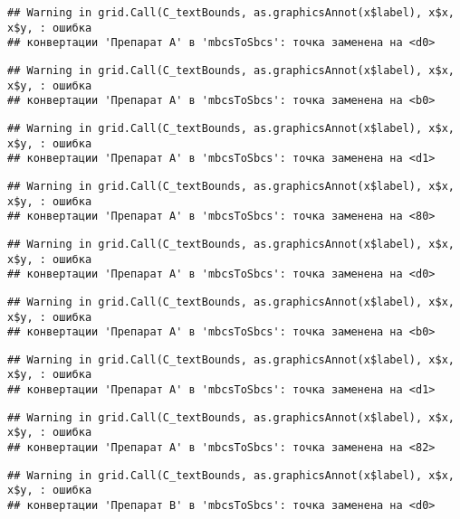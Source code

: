 \documentclass[
]{article}
\begin{document}
\begin{verbatim}
## Warning in grid.Call(C_textBounds, as.graphicsAnnot(x$label), x$x, x$y, : ошибка
## конвертации 'Препарат A' в 'mbcsToSbcs': точка заменена на <d0>
\end{verbatim}

\begin{verbatim}
## Warning in grid.Call(C_textBounds, as.graphicsAnnot(x$label), x$x, x$y, : ошибка
## конвертации 'Препарат A' в 'mbcsToSbcs': точка заменена на <b0>
\end{verbatim}

\begin{verbatim}
## Warning in grid.Call(C_textBounds, as.graphicsAnnot(x$label), x$x, x$y, : ошибка
## конвертации 'Препарат A' в 'mbcsToSbcs': точка заменена на <d1>
\end{verbatim}

\begin{verbatim}
## Warning in grid.Call(C_textBounds, as.graphicsAnnot(x$label), x$x, x$y, : ошибка
## конвертации 'Препарат A' в 'mbcsToSbcs': точка заменена на <80>
\end{verbatim}

\begin{verbatim}
## Warning in grid.Call(C_textBounds, as.graphicsAnnot(x$label), x$x, x$y, : ошибка
## конвертации 'Препарат A' в 'mbcsToSbcs': точка заменена на <d0>
\end{verbatim}

\begin{verbatim}
## Warning in grid.Call(C_textBounds, as.graphicsAnnot(x$label), x$x, x$y, : ошибка
## конвертации 'Препарат A' в 'mbcsToSbcs': точка заменена на <b0>
\end{verbatim}

\begin{verbatim}
## Warning in grid.Call(C_textBounds, as.graphicsAnnot(x$label), x$x, x$y, : ошибка
## конвертации 'Препарат A' в 'mbcsToSbcs': точка заменена на <d1>
\end{verbatim}

\begin{verbatim}
## Warning in grid.Call(C_textBounds, as.graphicsAnnot(x$label), x$x, x$y, : ошибка
## конвертации 'Препарат A' в 'mbcsToSbcs': точка заменена на <82>
\end{verbatim}

\begin{verbatim}
## Warning in grid.Call(C_textBounds, as.graphicsAnnot(x$label), x$x, x$y, : ошибка
## конвертации 'Препарат B' в 'mbcsToSbcs': точка заменена на <d0>
\end{verbatim}
\end{document}
